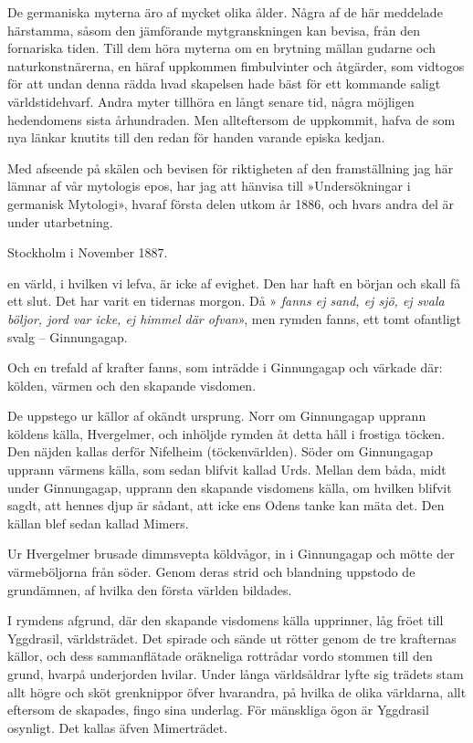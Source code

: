 De germaniska myterna äro af mycket olika ålder. Några af de här
meddelade härstamma, såsom den jämförande mytgranskningen kan bevisa,
från den fornariska tiden. Till dem höra myterna om en brytning mällan
gudarne och naturkonstnärerna, en häraf uppkommen fimbulvinter och
åtgärder, som vidtogos för att undan denna rädda hvad skapelsen hade
bäst för ett kommande saligt världstidehvarf. Andra myter
tillhöra en långt senare tid, några möjligen hedendomens sista
århundraden. Men allteftersom de uppkommit, hafva de som nya länkar
knutits till den redan för handen varande episka kedjan.

Med afseende på skälen och bevisen för riktigheten af den framställning
jag här lämnar af vår mytologis epos, har jag att hänvisa till
»Undersökningar i germanisk Mytologi», hvaraf första delen utkom år
1886, och hvars andra del är under utarbetning.

Stockholm i November 1887.





\dropcapD en värld, i hvilken vi lefva, är icke af evighet. Den har haft en
början och skall få ett slut. Det har varit en tidernas morgon. Då
»{\it 
fanns ej sand, ej sjö,
ej svala böljor,
jord var icke,
ej himmel där ofvan}»,
men rymden fanns, ett tomt ofantligt svalg -- Ginnungagap.

Och en trefald af krafter fanns, som inträdde i Ginnungagap och värkade
där: kölden, värmen och den skapande visdomen.

De uppstego ur källor af okändt ursprung. Norr om Ginnungagap upprann
köldens källa, Hvergelmer, och inhöljde rymden åt detta håll i frostiga
töcken. Den näjden kallas derför Nifelheim (töckenvärlden). Söder om
Ginnungagap upprann värmens källa, som sedan blifvit kallad Urds. Mellan
dem båda, midt under Ginnungagap, upprann den skapande visdomens källa,
om hvilken blifvit sagdt, att hennes djup är sådant, att icke ens Odens
tanke kan mäta det. Den källan blef sedan kallad Mimers.

Ur Hvergelmer brusade dimmsvepta köldvågor, in i Ginnungagap och mötte
der värmeböljorna från söder. Genom deras strid och blandning uppstodo
de grundämnen, af hvilka den första världen bildades.

I rymdens afgrund, där den skapande visdomens källa upprinner, låg fröet
till Yggdrasil, världsträdet. Det spirade och sände ut rötter genom de
tre krafternas källor, och dess sammanflätade oräkneliga rottrådar vordo
stommen till den grund, hvarpå underjorden hvilar. Under långa
världsåldrar lyfte sig trädets stam allt högre och sköt grenknippor
öfver hvarandra, på hvilka de olika världarna, allt eftersom de
skapades, fingo sina underlag. För mänskliga ögon är Yggdrasil osynligt.
Det kallas äfven Mimerträdet.

